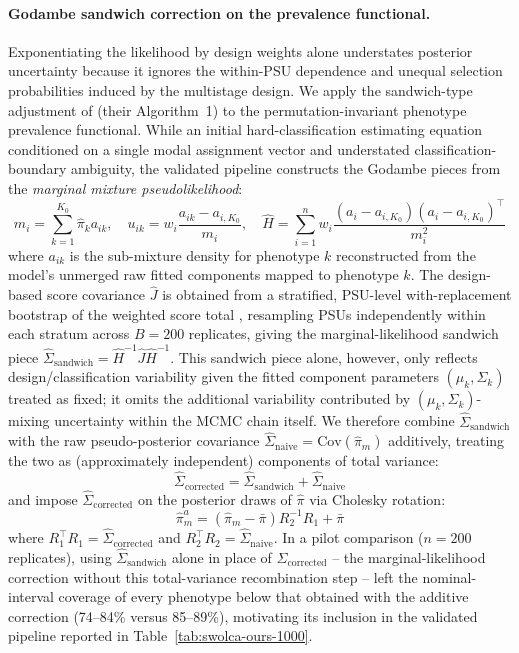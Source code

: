 \documentclass[11pt]{article}
\begin{document}
\paragraph{Godambe sandwich correction on the prevalence functional.} Exponentiating the likelihood by design weights alone understates posterior uncertainty because it ignores the within-PSU dependence and unequal selection probabilities induced by the multistage design. We apply the sandwich-type adjustment of \citet{williamssavitsky2021uncertainty} (their Algorithm~1) to the permutation-invariant phenotype prevalence functional. While an initial hard-classification estimating equation conditioned on a single modal assignment vector and understated classification-boundary ambiguity, the validated pipeline constructs the Godambe pieces from the \emph{marginal mixture pseudolikelihood}:
\begin{equation}
m_i = \sum_{k=1}^{K_0} \hat\pi_k a_{ik}, \quad u_{ik} = w_i \frac{a_{ik} - a_{i, K_0}}{m_i}, \quad \hat H = \sum_{i=1}^n w_i \frac{(a_i - a_{i, K_0})(a_i - a_{i, K_0})^\top}{m_i^2}
\end{equation}
where $a_{ik}$ is the sub-mixture density for phenotype $k$ reconstructed from the model's unmerged raw fitted components mapped to phenotype $k$. The design-based score covariance $\hat J$ is obtained from a stratified, PSU-level with-replacement bootstrap of the weighted score total \citep{raowu1988resampling}, resampling PSUs independently within each stratum across $B = 200$ replicates, giving the marginal-likelihood sandwich piece $\hat\Sigma_{\text{sandwich}} = \hat H^{-1}\hat J \hat H^{-1}$. This sandwich piece alone, however, only reflects design/classification variability given the fitted component parameters $(\mu_k, \Sigma_k)$ treated as fixed; it omits the additional variability contributed by $(\mu_k,\Sigma_k)$-mixing uncertainty within the MCMC chain itself. We therefore combine $\hat\Sigma_{\text{sandwich}}$ with the raw pseudo-posterior covariance $\hat\Sigma_{\text{naive}} = \text{Cov}(\hat\pi_m)$ additively, treating the two as (approximately independent) components of total variance:
\begin{equation}
\hat\Sigma_{\text{corrected}} = \hat\Sigma_{\text{sandwich}} + \hat\Sigma_{\text{naive}}
\end{equation}
and impose $\hat\Sigma_{\text{corrected}}$ on the posterior draws of $\hat\pi$ via Cholesky rotation:
\begin{equation}
\hat\pi_m^a = (\hat\pi_m - \bar\pi) R_2^{-1} R_1 + \bar\pi
\end{equation}
where $R_1^\top R_1 = \hat\Sigma_{\text{corrected}}$ and $R_2^\top R_2 = \hat\Sigma_{\text{naive}}$. In a pilot comparison ($n=200$ replicates), using $\hat\Sigma_{\text{sandwich}}$ alone in place of $\hat\Sigma_{\text{corrected}}$ -- the marginal-likelihood correction without this total-variance recombination step -- left the nominal-interval coverage of every phenotype below that obtained with the additive correction (74--84\% versus 85--89\%), motivating its inclusion in the validated pipeline reported in Table~\ref{tab:swolca-ours-1000}.
\end{document}
